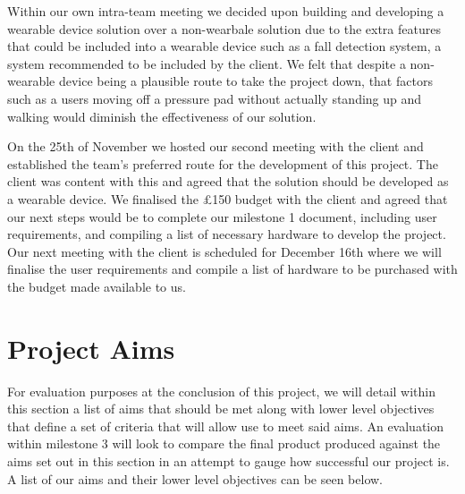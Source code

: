         Within our own intra-team meeting we decided upon building and developing a wearable device solution over a
        non-wearbale solution due to the extra features that could be included into a wearable device such as a fall
        detection system, a system recommended to be included by the client. We felt that despite a non-wearable device
        being a plausible route to take the project down, that factors such as a users moving off a pressure
        pad without actually standing up and walking would diminish the effectiveness of our solution.

        On the 25th of November we hosted our second meeting with the client and established the team's preferred route
        for the development of this project. The client was content with this and agreed that the solution should be
        developed as a wearable device. We finalised the £150 budget with the client and agreed that our next steps
        would be to complete our milestone 1 document, including user requirements, and compiling a list of necessary
        hardware to develop the project. Our next meeting with the client is scheduled for December 16th where we will
        finalise the user requirements and compile a list of hardware to be purchased with the budget made available to
        us.

    \section{Project Aims}
        For evaluation purposes at the conclusion of this project, we will detail within this section a list of aims
        that should be met along with lower level objectives that define a set of criteria that will allow use to meet
        said aims. An evaluation within milestone 3 will look to compare the final product produced against the aims set
        out in this section in an attempt to gauge how successful our project is. A list of our aims and their lower
        level objectives can be seen below.

